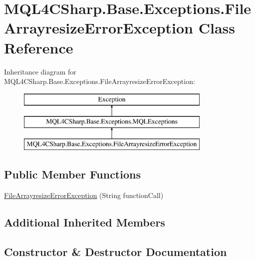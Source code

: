 \hypertarget{class_m_q_l4_c_sharp_1_1_base_1_1_exceptions_1_1_file_arrayresize_error_exception}{}\section{M\+Q\+L4\+C\+Sharp.\+Base.\+Exceptions.\+File\+Arrayresize\+Error\+Exception Class Reference}
\label{class_m_q_l4_c_sharp_1_1_base_1_1_exceptions_1_1_file_arrayresize_error_exception}
Inheritance diagram for M\+Q\+L4\+C\+Sharp.\+Base.\+Exceptions.\+File\+Arrayresize\+Error\+Exception\+:\begin{figure}[H]
\begin{center}
\leavevmode
\includegraphics[height=3.000000cm]{class_m_q_l4_c_sharp_1_1_base_1_1_exceptions_1_1_file_arrayresize_error_exception}
\end{center}
\end{figure}
\subsection*{Public Member Functions}
\begin{DoxyCompactItemize}
\item 
\hyperlink{class_m_q_l4_c_sharp_1_1_base_1_1_exceptions_1_1_file_arrayresize_error_exception_a521d8568a3581144de4f741c604615e1}{File\+Arrayresize\+Error\+Exception} (String function\+Call)
\end{DoxyCompactItemize}
\subsection*{Additional Inherited Members}


\subsection{Constructor \& Destructor Documentation}
